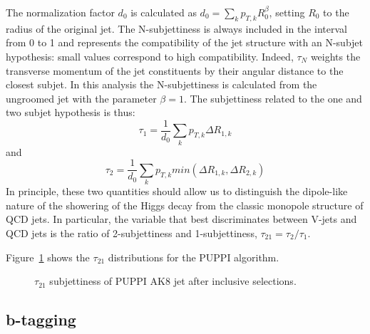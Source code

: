 The normalization factor $d_0$ is calculated as $d_0 = \sum_k p_{T, k} R_0^\beta$, setting $R_0$ to the radius of the original jet.
The N-subjettiness is always included in the interval from 0 to 1 and represents the compatibility of the jet structure with an N-subjet hypothesis: small values correspond to high compatibility. Indeed, $\tau_N$ weights the transverse momentum of the jet constituents by their angular distance to the closest subjet.
In this analysis the N-subjettiness is calculated from the ungroomed jet with the parameter $\beta=1$. The subjettiness related to the one and two subjet hypothesis is thus:
$$\tau_1 = \frac{1}{d_0} \sum_k p_{T,k} \Delta R_{1,k}$$
and
$$\tau_2 = \frac{1}{d_0} \sum_k p_{T,k} min( \Delta R_{1,k}, \Delta R_{2,k} )$$
In principle, these two quantities should allow us to distinguish the dipole-like
nature of the showering of the Higgs decay from the classic monopole structure of
QCD jets. In particular, the variable that best discriminates between V-jets and
QCD jets is the ratio of 2-subjettiness and 1-subjettiness, $\tau_{21} = \tau_2 / \tau_1$.

Figure~\ref{fig:fatjet_pre_tau21} shows the $\tau_{21}$ distributions for the PUPPI algorithm.

\begin{figure}[!htb]
  \begin{center}
  \end{center}
  \caption{$\tau_{21}$ subjettiness of PUPPI AK8 jet after inclusive selections.}
  \label{fig:fatjet_pre_tau21}
\end{figure}



\subsection{b-tagging}\label{ssec:btagging}
 

